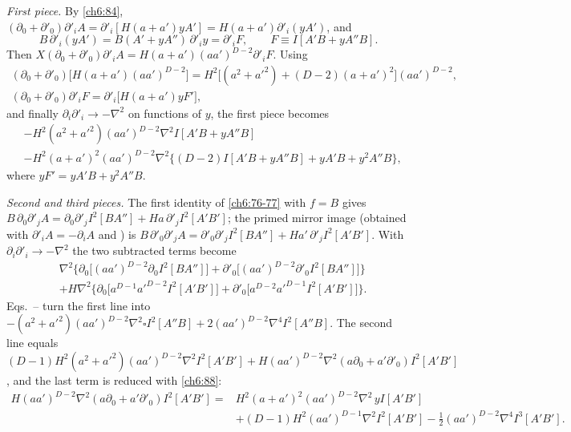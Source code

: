 \emph{First piece.} By \eqref{ch6:84}, $(\partial_0+\partial'_0)\partial'_iA=\partial'_i[H(a+a')yA']=H(a+a')\partial'_i(yA')$, and
\begin{equation}
B\,\partial'_i(yA')=B(A'+yA'')\,\partial'_iy=\partial'_iF,\qquad F\equiv I[A'B+yA''B].
\end{equation}
Then $X(\partial_0+\partial'_0)\partial'_iA=H(a+a')(aa')^{D-2}\partial'_iF$. Using
\begin{gather}
(\partial_0+\partial'_0)\big[H(a+a')(aa')^{D-2}\big]=H^2\big[(a^2+a'^2)+(D-2)(a+a')^2\big](aa')^{D-2},\nonumber\\
(\partial_0+\partial'_0)\partial'_iF=\partial'_i\big[H(a+a')yF'\big],
\end{gather}
and finally $\partial_i\partial'_i\to-\nabla^2$ on functions of $y$, the first piece becomes
\begin{equation}
\begin{split}
&-H^2(a^2+a'^2)(aa')^{D-2}\nabla^2I[A'B+yA''B]\\
&-H^2(a+a')^2(aa')^{D-2}\nabla^2\big\{(D-2)I[A'B+yA''B]+yA'B+y^2A''B\big\},
\end{split}
\end{equation}
where $yF'=yA'B+y^2A''B$.

\emph{Second and third pieces.} The first identity of \eqref{ch6:76-77} with $f=B$ gives
$B\,\partial_0\partial'_jA=\partial_0\partial'_jI^2[BA'']+Ha\,\partial'_jI^2[A'B']$; the primed mirror image (obtained with $\partial'_i A=-\partial_iA$ and
) is $B\,\partial'_0\partial'_jA=\partial'_0\partial'_jI^2[BA'']+Ha'\,\partial'_jI^2[A'B']$. With $\partial_i\partial'_i\to-\nabla^2$ the two
subtracted terms become
\begin{equation}
\begin{split}
&\nabla^2\Big\{\partial_0\big[(aa')^{D-2}\partial_0I^2[BA'']\big]+\partial'_0\big[(aa')^{D-2}\partial'_0I^2[BA'']\big]\Big\}\\
&+H\nabla^2\Big\{\partial_0\big[a^{D-1}a'^{D-2}I^2[A'B']\big]+\partial'_0\big[a^{D-2}a'^{D-1}I^2[A'B']\big]\Big\}.
\end{split}
\end{equation}
Eqs.~-- turn the first line into $-(a^2+a'^2)(aa')^{D-2}\nabla^2\square I^2[A''B]+2(aa')^{D-2}\nabla^4I^2[A''B]$. The second line
equals $(D-1)H^2(a^2+a'^2)(aa')^{D-2}\nabla^2I^2[A'B']+H(aa')^{D-2}\nabla^2(a\partial_0+a'\partial'_0)I^2[A'B']$, and the last term is reduced with
\eqref{ch6:88}:
\begin{equation}
\begin{split}
H(aa')^{D-2}\nabla^2(a\partial_0+a'\partial'_0)I^2[A'B']={}&H^2(a+a')^2(aa')^{D-2}\nabla^2\,yI[A'B']\\
&+(D-1)H^2(aa')^{D-1}\nabla^2I^2[A'B']-\tfrac12(aa')^{D-2}\nabla^4I^3[A'B'] .
\end{split}
\end{equation}

